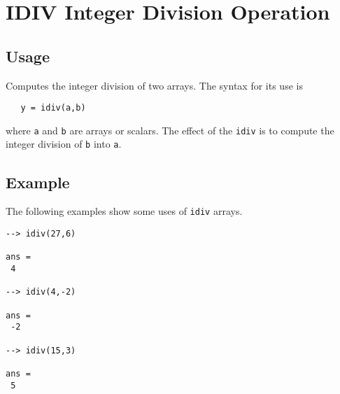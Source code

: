 \section{IDIV Integer Division Operation}

\subsection{Usage}

Computes the integer division of two arrays.  The syntax for its use is
\begin{verbatim}
   y = idiv(a,b)
\end{verbatim}
where \verb|a| and \verb|b| are arrays or scalars.  The effect of the \verb|idiv|
is to compute the integer division of \verb|b| into \verb|a|.
\subsection{Example}

The following examples show some uses of \verb|idiv|
arrays.
\begin{verbatim}
--> idiv(27,6)

ans = 
 4 

--> idiv(4,-2)

ans = 
 -2 

--> idiv(15,3)

ans = 
 5 
\end{verbatim}
